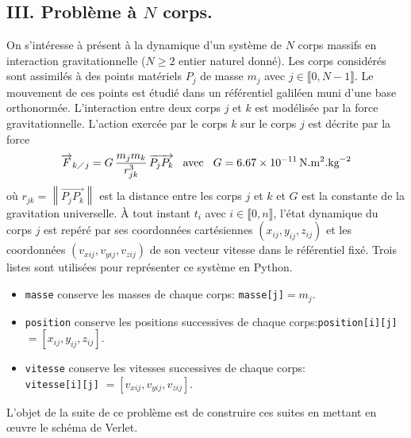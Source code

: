 \subsection*{III. Problème à $N$ corps.}
On s'intéresse à présent à la dynamique d'un système de $N$ corps massifs en interaction gravitationnelle ($N\geq 2$ entier naturel donné). Les corps considérés sont assimilés à des points matériels $P_j$ de masse $m_j$ avec $j\in \llbracket 0, N-1 \rrbracket$. Le mouvement de ces points est étudié dans un référentiel galiléen muni d'une base orthonormée. L'interaction entre deux corps $j$ et $k$ est modélisée par la force gravitationnelle. L'action exercée par le corps $k$ sur le corps $j$ est décrite par la force
\begin{displaymath}
  \overrightarrow{F}_{k\diagup j} = G\,\frac{m_j m_k}{r_{jk}^3}\, \overrightarrow{P_j P_k}\hspace{0.3cm} \text{avec} \hspace{0.3cm}
G=6.67\times 10^{-11}\,\text{N}.\text{m}^2.\text{kg}^{-2}  
\end{displaymath}
où $r_{jk} = \left\|\overrightarrow{P_j P_k}\right\|$ est la distance entre les corps $j$ et $k$ et $G$ est la constante de la gravitation universelle.\newline
\`A tout instant $t_i$ avec $i\in \llbracket 0,n \rrbracket$, l'état dynamique du corps $j$ est repéré par ses coordonnées cartésiennes $(x_{ij},y_{ij},z_{ij})$ et les coordonnées $(v_{xij},v_{yij},v_{zij})$ de son vecteur vitesse dans le référentiel fixé.\newline
Trois listes sont utilisées pour représenter ce système en Python.
\begin{itemize}
  \item \texttt{masse} conserve les masses de chaque corps: \texttt{masse[j]}$ = m_j$.
  \item \texttt{position} conserve les positions successives de chaque corps:\newline \texttt{position[i][j]} $=\left[ x_{ij}, y_{ij}, z_{ij}\right]$.
  \item \texttt{vitesse} conserve les vitesses successives de chaque corps:\\ \texttt{vitesse[i][j]} $=\left[ v_{xij}, v_{yij}, v_{zij}\right]$. 
\end{itemize}
L'objet de la suite de ce problème est de construire ces suites en mettant en \oe{}uvre le schéma de Verlet.
